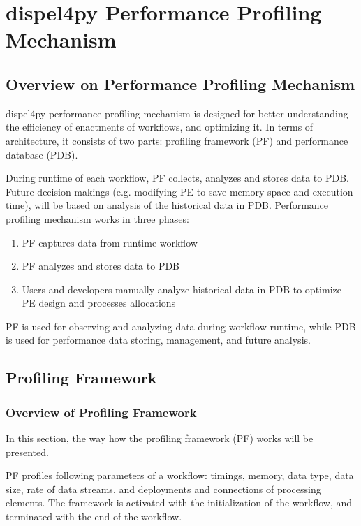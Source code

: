\documentclass[10pt,twoside,openright,logo]{report}
\begin{document}

\chapter{dispel4py Performance Profiling Mechanism}
\section{Overview on Performance Profiling Mechanism}
dispel4py performance profiling mechanism is designed for better understanding the efficiency of enactments of workflows, and optimizing it. In terms of architecture, it consists of two parts: profiling framework (PF) and performance database (PDB).

During runtime of each workflow, PF collects, analyzes and stores data to PDB. Future decision makings (e.g. modifying PE to save memory space and execution time), will be based on analysis of the historical data in PDB. Performance profiling mechanism works in three phases:
\begin{enumerate}
    \item PF captures data from runtime workflow
    \item PF analyzes and stores data to PDB
    \item Users and developers manually analyze historical data in PDB to optimize PE design and processes allocations
\end{enumerate}

PF is used for observing and analyzing data during workflow runtime, while PDB is used for performance data storing, management, and future analysis.

\section{Profiling Framework}
\subsection{Overview of Profiling Framework}
In this section, the way how the profiling framework (PF) works will be presented.

PF profiles following parameters of a workflow: timings, memory, data type, data size, rate of data streams, and deployments and connections of processing elements. The framework is activated with the initialization of the workflow, and terminated with the end of the workflow.
\end{document}
